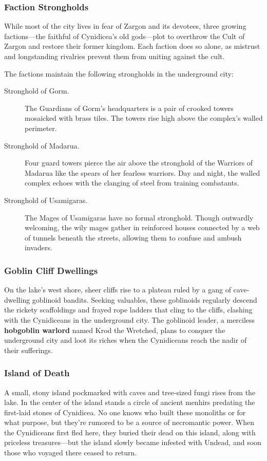 \documentclass[10pt,a4paper,twoside,bg=print,twocolumn,openany,nodeprecatedcode]{dndbook}
\begin{document}
\subsubsection{Faction Strongholds}
While most of the city lives in fear of Zargon and its devotees, three growing factions—the faithful of Cynidicea's old gods—plot to overthrow the Cult of Zargon and restore their former kingdom. Each faction does so alone, as mistrust and longstanding rivalries prevent them from uniting against the cult.

The factions maintain the following strongholds in the underground city:


\begin{description}
\item[Stronghold of Gorm.]
The Guardians of Gorm's headquarters is a pair of crooked towers mosaicked with brass tiles. The towers rise high above the complex's walled perimeter.
\item[Stronghold of Madarua.]
Four guard towers pierce the air above the stronghold of the Warriors of Madarua like the spears of her fearless warriors. Day and night, the walled complex echoes with the clanging of steel from training combatants.
\item[Stronghold of Usamigaras.]
The Mages of Usamigaras have no formal stronghold. Though outwardly welcoming, the wily mages gather in reinforced houses connected by a web of tunnels beneath the streets, allowing them to confuse and ambush invaders.
\end{description}

\subsubsection{Goblin Cliff Dwellings}
On the lake's west shore, sheer cliffs rise to a plateau ruled by a gang of cave-dwelling goblinoid bandits. Seeking valuables, these goblinoids regularly descend the rickety scaffoldings and frayed rope ladders that cling to the cliffs, clashing with the Cynidiceans in the underground city. The goblinoid leader, a merciless \textbf{hobgoblin warlord} named Krod the Wretched, plans to conquer the underground city and loot its riches when the Cynidiceans reach the nadir of their sufferings.

\subsubsection{Island of Death}
A small, stony island pockmarked with caves and tree-sized fungi rises from the lake. In the center of the island stands a circle of ancient menhirs predating the first-laid stones of Cynidicea. No one knows who built these monoliths or for what purpose, but they're rumored to be a source of necromantic power. When the Cynidiceans first fled here, they buried their dead on this island, along with priceless treasures—but the island slowly became infested with Undead, and soon those who voyaged there ceased to return.
\end{document}
